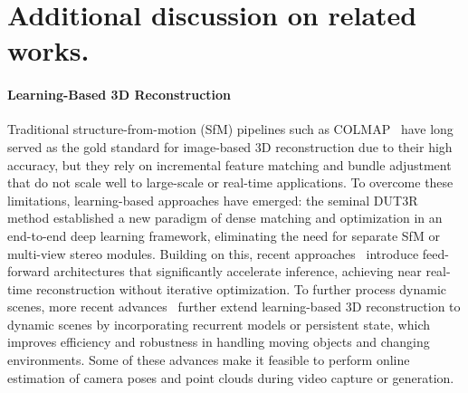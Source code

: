 

% 

\section{Additional discussion on related works.}
\label{supp:related}
\paragraph{Learning-Based 3D Reconstruction}
Traditional structure-from-motion (SfM) pipelines such as COLMAP~\cite{schoenberger2016sfm} have long served as the gold standard for image-based 3D reconstruction due to their high accuracy, but they rely on incremental feature matching and bundle adjustment that do not scale well to large-scale or real-time applications. To overcome these limitations, learning-based approaches have emerged: the seminal DUT3R~\cite{wang2024dust3r} method established a new paradigm of dense matching and optimization in an end-to-end deep learning framework, eliminating the need for separate SfM or multi-view stereo modules. Building on this, recent approaches~\cite{zhang2025flare,wang2025vggt} introduce feed-forward architectures that significantly accelerate inference, achieving near real-time reconstruction without iterative optimization. To further process dynamic scenes, more recent advances~\cite{zhang2025monstr,li2024Mega-SAM,wang2025cut3r} further extend learning-based 3D reconstruction to dynamic scenes by incorporating recurrent models or persistent state, which improves efficiency and robustness in handling moving objects and changing environments. Some of these advances make it feasible to perform online estimation of camera poses and point clouds during video capture or generation. 

